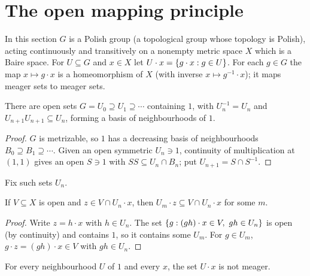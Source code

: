 
\section{The open mapping principle}

In this section $G$ is a Polish group (a topological group whose topology is Polish), acting
continuously and transitively on a nonempty metric space $X$ which is a Baire space. For $U\subseteq G$
and $x\in X$ let $U\cdot x=\left\{ g\cdot x:g\in U \right\}$. For each $g\in G$ the map $x\mapsto g\cdot x$ is a
homeomorphism of $X$ (with inverse $x\mapsto g^{-1}\cdot x$); it maps meager sets to meager sets.

\begin{lemma}\label{lem:vm-basis}
There are open sets $G=U_0\supseteq U_1\supseteq\cdots$ containing $1$, with $U_n^{-1}=U_n$ and
$U_{n+1}U_{n+1}\subseteq U_n$, forming a basis of neighbourhoods of $1$.
\end{lemma}

\begin{proof}
$G$ is metrizable, so $1$ has a decreasing basis of neighbourhoods $B_0\supseteq B_1\supseteq\cdots$. Given an
open symmetric $U_n\ni1$, continuity of multiplication at $(1,1)$ gives an open $S\ni1$ with $SS\subseteq
U_n\cap B_n$; put $U_{n+1}=S\cap S^{-1}$.
\end{proof}


Fix such sets $U_n$.

\begin{lemma}\label{lem:vm31}
If $V\subseteq X$ is open and $z\in V\cap U_n\cdot x$, then $U_m\cdot z\subseteq V\cap U_n\cdot x$ for some $m$.
\end{lemma}

\begin{proof}
Write $z=h\cdot x$ with $h\in U_n$. The set $\left\{ g:(gh)\cdot x\in V,\ gh\in U_n \right\}$ is open (by continuity)
and contains $1$, so it contains some $U_m$. For $g\in U_m$, $g\cdot z=(gh)\cdot x\in V$ with $gh\in U_n$.
\end{proof}


\begin{lemma}\label{lem:vm32}
For every neighbourhood $U$ of $1$ and every $x$, the set $U\cdot x$ is not meager.
\end{lemma}

